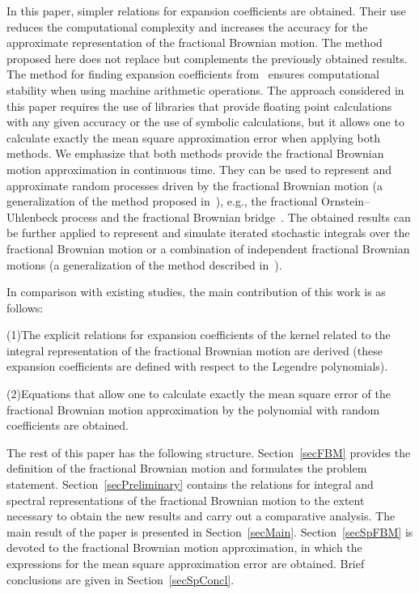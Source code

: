 \documentclass[10pt,reqno]{amsart}
\theoremstyle{plain}
\theoremstyle{remark}
\begin{document}
In this paper, simpler relations for expansion coefficients are obtained. Their use reduces the computational complexity and increases the accuracy for the approximate representation of the fractional Brownian motion. The method proposed here does not replace but complements the previously obtained results. The method for finding expansion coefficients from~\cite{Ryb_Comp25} ensures computational stability when using machine arithmetic operations. The approach considered in this paper requires the use of libraries that provide floating point calculations with any given accuracy or the use of symbolic calculations, but it allows one to calculate exactly the mean square approximation error when applying both methods. We emphasize that both methods provide the fractional Brownian motion approximation in continuous time. They can be used to represent and approximate random processes driven by the fractional Brownian motion (a generalization of the method proposed in~\cite{Ryb_DUPU20, RybYus_IOP20}), e.g., the fractional Ornstein--Uhlenbeck process and the fractional Brownian bridge~\cite{Thao_EWJM13}. The obtained results can be further applied to represent and simulate iterated stochastic integrals over the fractional Brownian motion or a combination of independent fractional Brownian motions (a generalization of the method described in~\cite{Ryb_Springer22}).

In comparison with existing studies, the main contribution of this work is as follows:

(1)\;The explicit relations for expansion coefficients of the kernel related to the integral representation of the fractional Brownian motion are derived (these expansion coefficients are defined with respect to the Legendre polynomials).

(2)\;Equations that allow one to calculate exactly the mean square error of the fractional Brownian motion approximation by the polynomial with random coefficients are obtained.

The rest of this paper has the following structure. Section~\ref{secFBM} provides the definition of the fractional Brownian motion and formulates the problem statement. Section~\ref{secPreliminary} contains the relations for integral and spectral representations of the fractional Brownian motion to the extent necessary to obtain the new results and carry out a comparative analysis. The main result of the paper is presented in Section~\ref{secMain}. Section~\ref{secSpFBM} is devoted to the fractional Brownian motion approximation, in which the expressions for the mean square approximation error are obtained. Brief conclusions are given in Section~\ref{secSpConcl}.
\end{document}
